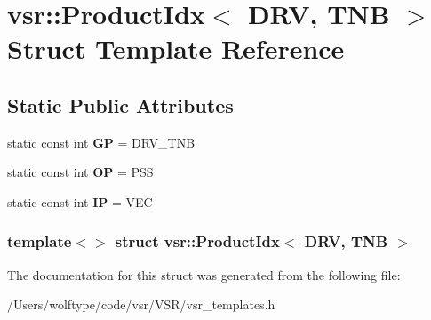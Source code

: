 \hypertarget{structvsr_1_1_product_idx_3_01_d_r_v_00_01_t_n_b_01_4}{\section{vsr\-:\-:Product\-Idx$<$ D\-R\-V, T\-N\-B $>$ Struct Template Reference}
\label{structvsr_1_1_product_idx_3_01_d_r_v_00_01_t_n_b_01_4}
}
\subsection*{Static Public Attributes}
\begin{DoxyCompactItemize}
\item 
\hypertarget{structvsr_1_1_product_idx_3_01_d_r_v_00_01_t_n_b_01_4_a764f4de7b5bd78a75e96d5e68530df75}{static const int {\bfseries G\-P} = D\-R\-V\-\_\-\-T\-N\-B}\label{structvsr_1_1_product_idx_3_01_d_r_v_00_01_t_n_b_01_4_a764f4de7b5bd78a75e96d5e68530df75}

\item 
\hypertarget{structvsr_1_1_product_idx_3_01_d_r_v_00_01_t_n_b_01_4_ae7cf55b96a711a68e29118b0e41cb625}{static const int {\bfseries O\-P} = P\-S\-S}\label{structvsr_1_1_product_idx_3_01_d_r_v_00_01_t_n_b_01_4_ae7cf55b96a711a68e29118b0e41cb625}

\item 
\hypertarget{structvsr_1_1_product_idx_3_01_d_r_v_00_01_t_n_b_01_4_a143238540219efd7c9d8828102ef853c}{static const int {\bfseries I\-P} = V\-E\-C}\label{structvsr_1_1_product_idx_3_01_d_r_v_00_01_t_n_b_01_4_a143238540219efd7c9d8828102ef853c}

\end{DoxyCompactItemize}
\subsubsection*{template$<$$>$ struct vsr\-::\-Product\-Idx$<$ D\-R\-V, T\-N\-B $>$}



The documentation for this struct was generated from the following file\-:\begin{DoxyCompactItemize}
\item 
/\-Users/wolftype/code/vsr/\-V\-S\-R/vsr\-\_\-templates.\-h\end{DoxyCompactItemize}
